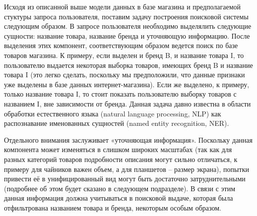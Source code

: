 \documentclass[12pt,a4paper]{article}
\begin{document}
\begin{table}[H]
\begin{center}
    \caption{Примеры запросов и соответствующих им смысловых частей}
\end{center}
\end{table}

Исходя из описанной выше модели данных в базе магазина и предполагаемой стуктуры запроса пользователя, поставим задачу построения поисковой системы следующим образом. В запросе пользователя необходимо выделялить следующие сущности: название товара, название бренда и уточняющую информацию. После выделения этих компонент, соответствующим образом ведется поиск по базе товаров магазина. К примеру, если выделен и бренд B, и название товара I, то пользователю выдается некоторая выборка товаров, имеющих бренд B и название товара I (это легко сделать, поскольку мы предположили, что данные признаки уже выделены в базе данных интернет-магазина). Если же выделено, к примеру, только название товара I, то стоит показать пользователю выборку товаров с названием I, вне зависимости от бренда. Данная задача давно известна в области обработки естественного языка (natural language processing, NLP) как распознавание именованных сущностей (named entity recognition, NER).

Отдельного внимания заслуживает «уточняющая информация». Поскольку данная компонента может изменяться в слишком широких масштабах (так как для разных категорий товаров подробности описания могут сильно отличаться, к примеру для чайников важен объем, а для планшетов -- размер экрана), попытки привести её в унифицированный вид могут быть достаточно затруднительными (подробнее об этом будет сказано в следующем подразделе). В связи с этим данная информация должна учитываться в поисковой выдаче, которая была отфильтрована названием товара и бренда, некоторым особым образом.
\end{document}
